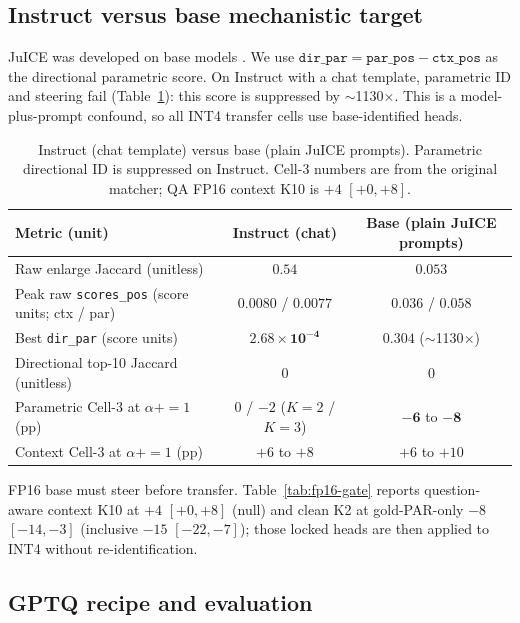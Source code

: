 \documentclass{article} %
\begin{document}
\subsection{Instruct versus base mechanistic target}
\label{sec:instruct-base}

JuICE was developed on base models \citep{li2025taming}. We use $\texttt{dir\_par}=\texttt{par\_pos}-\texttt{ctx\_pos}$ as the directional parametric score. On Instruct with a chat template, parametric ID and steering fail (Table~\ref{tab:instruct-base}): this score is suppressed by $\sim$1130$\times$. This is a model-plus-prompt confound, so all INT4 transfer cells use base-identified heads.

\begin{table}[t]
\caption{Instruct (chat template) versus base (plain JuICE prompts). Parametric directional ID is suppressed on Instruct. Cell-3 numbers are from the original matcher; QA FP16 context K10 is $+4$ $[+0,+8]$.}
\label{tab:instruct-base}
\centering
\footnotesize
\setlength{\tabcolsep}{3pt}
\begin{tabular}{p{2.05in}cc}
\toprule
Metric (unit) & Instruct (chat) & Base (plain JuICE prompts) \\
\midrule
Raw enlarge Jaccard (unitless) & $\mathbf{0.54}$ & $\mathbf{0.053}$ \\
Peak raw \texttt{scores\_pos} (score units; ctx / par) & $0.0080$ / $0.0077$ & $\mathbf{0.036}$ / $\mathbf{0.058}$ \\
Best \texttt{dir\_par} (score units) & $\mathbf{2.68\times 10^{-4}}$ & $\mathbf{0.304}$ ($\sim$1130$\times$) \\
Directional top-10 Jaccard (unitless) & $0$ & $0$ \\
Parametric Cell-3 at $\alpha{+}{=}1$ (pp) & $0$ / $-2$ ($K{=}2$ / $K{=}3$) & $\mathbf{-6}$ to $\mathbf{-8}$ \\
Context Cell-3 at $\alpha{+}{=}1$ (pp) & $+6$ to $+8$ & $+6$ to $+10$ \\
\bottomrule
\end{tabular}
\end{table}

FP16 base must steer before transfer. Table~\ref{tab:fp16-gate} reports question-aware context K10 at $+4$ $[+0,+8]$ (null) and clean K2 at gold-PAR-only $-8$ $[-14,-3]$ (inclusive $-15$ $[-22,-7]$); those locked heads are then applied to INT4 without re-identification.

\subsection{GPTQ recipe and evaluation}
\end{document}
